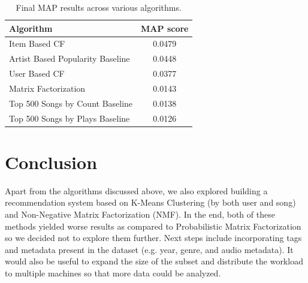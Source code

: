 \documentclass[11pt,preprint]{aastex}
\begin{document}
\begin{table}[h]
\begin{center}
\begin{tabular}{lc}
\hline
\bf{Algorithm} &  \bf{MAP score}\\ \hline
Item Based  CF  &  0.0479 \\ 
Artist Based Popularity Baseline  & 0.0448    \\ 
User Based  CF  &  0.0377 \\ 
Matrix Factorization  &   0.0143  \\ 
Top 500 Songs by Count  Baseline &  0.0138  \\ 
Top 500 Songs by Plays  Baseline &  0.0126  \\ 
\end{tabular}
\caption{Final MAP results across various algorithms.}\label{tab:map}
\end{center}
\end{table}

\section{Conclusion}
Apart from the algorithms discussed above, we also explored building a recommendation system based on K-Means Clustering (by both user and song) and Non-Negative Matrix Factorization (NMF). In the end, both of these methods yielded worse results as compared to Probabilistic Matrix Factorization so we decided not to explore them further. Next steps include incorporating tags and metadata present in the dataset (e.g. year, genre, and audio metadata). It would also be useful to expand the size of the subset and distribute the workload to multiple machines so that more data could be analyzed.


\end{document}

